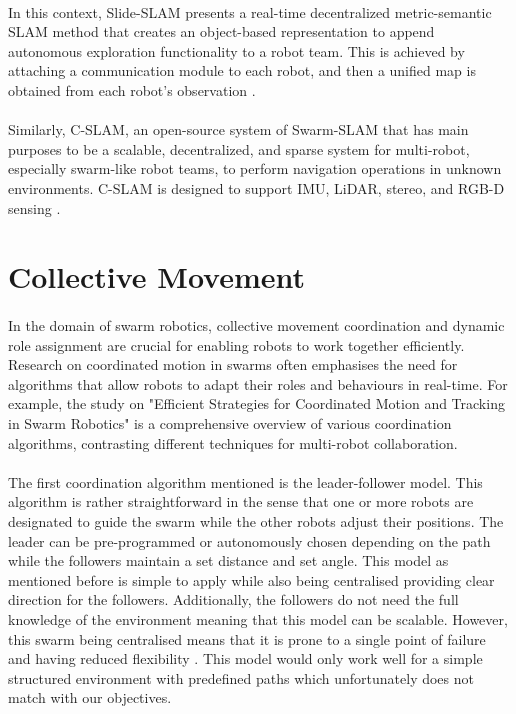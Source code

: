 \paragraph*{}
In this context, Slide-SLAM presents a real-time decentralized metric-semantic SLAM method that creates an object-based representation to append autonomous exploration functionality to a robot team. This is achieved by attaching a communication module to each robot, and then a unified map is obtained from each robot’s observation \cite{liu2024slideslam}.

\paragraph*{}
Similarly, C-SLAM, an open-source system of Swarm-SLAM that has main purposes to be a scalable, decentralized, and sparse system for multi-robot, especially swarm-like robot teams, to perform navigation operations in unknown environments. C-SLAM is designed to support IMU, LiDAR, stereo, and RGB-D sensing \cite{lajoie2024swarm}.

\section{Collective Movement}

\paragraph*{}
In the domain of swarm robotics, collective movement coordination and dynamic role assignment are crucial for enabling robots to work together efficiently. Research on coordinated motion in swarms often emphasises the need for algorithms that allow robots to adapt their roles and behaviours in real-time. For example, the study on "Efficient Strategies for Coordinated Motion and Tracking in Swarm Robotics" is a comprehensive overview of various coordination algorithms, contrasting different techniques for multi-robot collaboration. 

\paragraph*{}
The first coordination algorithm mentioned is the leader-follower model. This algorithm is rather straightforward in the sense that one or more robots are designated to guide the swarm while the other robots adjust their positions. The leader can be pre-programmed or autonomously chosen depending on the path while the followers maintain a set distance and set angle. This model as mentioned before is simple to apply while also being centralised providing clear direction for the followers. Additionally, the followers do not need the full knowledge of the environment meaning that this model can be scalable. However, this swarm being centralised means that it is prone to a single point of failure and having reduced flexibility \cite{mehta2024robust}. This model would only work well for a simple structured environment with predefined paths which unfortunately does not match with our objectives.

